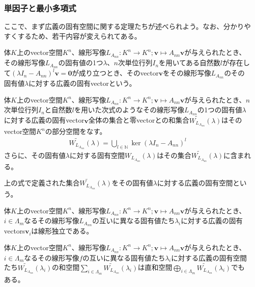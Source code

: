 \documentclass[dvipdfmx]{jsarticle}
\begin{document}
\subsubsection{単因子と最小多項式}%
ここで、まず広義の固有空間に関する定理たちが述べられよう。なお、分かりやすくするため、若干内容が変えられてある。
\begin{dfn*}
体$K$上のvector空間$K^{n}$、線形写像$L_{A_{nn}}:K^{n} \rightarrow K^{n};\mathbf{v} \mapsto A_{nn}\mathbf{v}$が与えられたとき、その線形写像$L_{A_{nn}}$の固有値の1つ$\lambda$、$n$次単位行列$I_{n}$を用いてある自然数$l$が存在して$\left( \lambda I_{n} - A_{nn} \right)^{l}\mathbf{v} = \mathbf{0}$が成り立つとき、そのvector$\mathbf{v}$をその線形写像$L_{A_{nn}}$のその固有値$\lambda$に対する広義の固有vectorという。
\end{dfn*}
\begin{thm*}
体$K$上のvector空間$K^{n}$、線形写像$L_{A_{nn}}:K^{n} \rightarrow K^{n};\mathbf{v} \mapsto A_{nn}\mathbf{v}$が与えられたとき、$n$次単位行列$I_{n}$と自然数$l$を用いた次式のようなその線形写像$L_{A_{nn}}$の1つの固有値$\lambda$に対する広義の固有vector$\mathbf{v}$全体の集合と零vectorとの和集合$\widetilde{W_{L_{A_{nn}}}}(\lambda)$はそのvector空間$K^{n}$の部分空間をなす。
\begin{align*}
\widetilde{W_{L_{A_{nn}}}}(\lambda) = \bigcup_{l \in \mathbb{N}} {\ker\left( \lambda I_{n} - A_{nn} \right)^{l}}
\end{align*}
さらに、その固有値$\lambda$に対する固有空間$W_{L_{A_{nn}}}(\lambda)$はその集合$\widetilde{W_{L_{A_{nn}}}}(\lambda)$に含まれる。
\end{thm*}
\begin{dfn*}
上の式で定義された集合$\widetilde{W_{L_{A_{nn}}}}(\lambda)$をその固有値$\lambda$に対する広義の固有空間という。
\end{dfn*}
\begin{thm*}
体$K$上のvector空間$K^{n}$、線形写像$L_{A_{nn}}:K^{n} \rightarrow K^{n};\mathbf{v} \mapsto A_{nn}\mathbf{v}$が与えられたとき、$i \in \varLambda_{m}$なるその線形写像$L_{A_{nn}}$の互いに異なる固有値たち$\lambda_{i}$に対する広義の固有vectors$\mathbf{v}_{i}$は線形独立である。
\end{thm*}
\begin{thm*}
体$K$上のvector空間$K^{n}$、線形写像$L_{A_{nn}}:K^{n} \rightarrow K^{n};\mathbf{v} \mapsto A_{nn}\mathbf{v}$が与えられたとき、$i \in \varLambda_{m}$なるその線形写像$f$の互いに異なる固有値たち$\lambda_{i}$に対する広義の固有空間たち$\widetilde{W_{L_{A_{nn}}}}\left( \lambda_{i} \right)$の和空間$\sum_{i \in \varLambda_{m}} {\widetilde{W_{L_{A_{nn}}}}\left( \lambda_{i} \right)}$は直和空間$\bigoplus_{i \in \varLambda_{m}} {\widetilde{W_{L_{A_{nn}}}}\left( \lambda_{i} \right)}$でもある。
\end{thm*}
\end{document}
